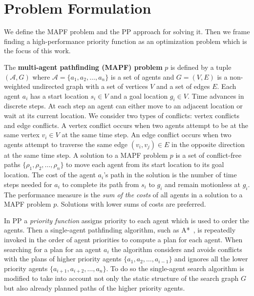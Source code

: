 \documentclass[letterpaper]{article} %
\begin{document}
\section{Problem Formulation}
\label{sec:problemFormulation}

We define the MAPF problem and the PP approach for solving it. Then we frame finding a high-performance priority function as an optimization problem which is the focus of this work.

The \textbf{multi-agent pathfinding (MAPF) problem} $ p $ is defined by a tuple $ (\mathcal{A}, G) $ where $ \mathcal{A} = \{a_1, a_2, \dots, a_n\} $ is a set of agents and $ G = (V, E) $ is a non-weighted undirected graph with a set of vertices $ V $ and a set of edges $ E $. Each agent $ a_i $ has a start location $ s_i \in V $ and a goal location $ g_i \in V $. Time advances in discrete steps. At each step an agent can either move to an adjacent location or wait at its current location. We consider two types of conflicts: vertex conflicts and edge conflicts. A vertex conflict occurs when two agents attempt to be at the same vertex $ v_i \in V $ at the same time step. An edge conflict occurs when two agents attempt to traverse the same edge $ (v_i, v_j) \in E $ in the opposite direction at the same time step. A solution to a MAPF problem $ p $ is a set of conflict-free paths $ \{\rho_1, \rho_2, \dots, \rho_n\} $ to move each agent from its start location to its goal location. The cost of the agent $ a_i $'s path in the solution is the number of time steps needed for $ a_i $ to complete its path from $ s_i $ to $ g_i $ and remain motionless at $ g_i $. The performance measure is the {\em sum of the costs} of all agents in a solution to a MAPF problem $ p $. Solutions with lower sums of costs are preferred.

In PP a \emph{priority function} assigns priority to each agent which is used to order the agents. Then a single-agent pathfinding algorithm, such as A*~\citep{AStar}, is repeatedly invoked in the order of agent priorities to compute a plan for each agent. When searching for a plan for an agent $ a_i $ the algorithm considers and avoids conflicts with the plans of higher priority agents $ \{a_1, a_2, \dots, a_{i - 1}\} $ and ignores all the lower priority agents $ \{a_{i + 1}, a_{i+2}, \dots, a_n\} $. To do so the single-agent search algorithm is modified to take into account not only the static structure of the search graph $ G $ but also already planned paths of the higher priority agents.
\end{document}
